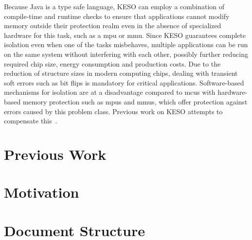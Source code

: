 		Because Java is a type safe language, KESO can employ a combination of compile-time and runtime checks to ensure
		that applications cannot modify memory outside their protection realm even in the absence of specialized hardware
		for this task, such as a \gls{mpu} or \gls{mmu}. Since KESO guarantees complete isolation even when one of the tasks
		misbehaves, multiple applications can be run on the same system without interfering with each other, possibly
		further reducing required chip size, energy consumption and production costs. Due to the reduction of structure
		sizes in modern computing chips, dealing with transient soft errors such as bit flips is mandatory for critical
		applications. Software-based mechanisms for isolation are at a disadvantage compared to \glspl{mcu} with
		hardware-based memory protection such as \glspl{mpu} and \glspl{mmu}, which offer protection against errors caused
		by this problem class. Previous work on KESO attempts to compensate this~\cite{thomm:11:jtres, stilkerich:13:lctes}.

	\section{Previous Work}
		\label{sec:intro:prev}

	\section{Motivation}
		\label{sec:intro:motivation}

	\section{Document Structure}
		\label{sec:intro:document-structure}
